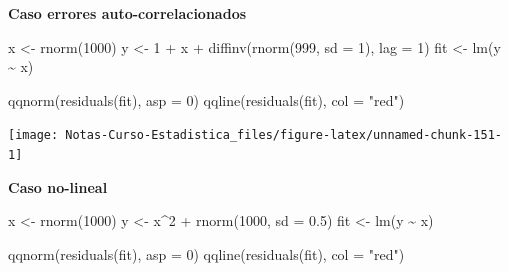 \documentclass[
  12pt,
]{book}
\newenvironment{Shaded}{\begin{snugshade}}{\end{snugshade}}
\newcommand{\AttributeTok}[1]{\textcolor[rgb]{0.77,0.63,0.00}{#1}}
\newcommand{\DecValTok}[1]{\textcolor[rgb]{0.00,0.00,0.81}{#1}}
\newcommand{\FloatTok}[1]{\textcolor[rgb]{0.00,0.00,0.81}{#1}}
\newcommand{\FunctionTok}[1]{\textcolor[rgb]{0.00,0.00,0.00}{#1}}
\newcommand{\NormalTok}[1]{#1}
\newcommand{\OtherTok}[1]{\textcolor[rgb]{0.56,0.35,0.01}{#1}}
\newcommand{\SpecialCharTok}[1]{\textcolor[rgb]{0.00,0.00,0.00}{#1}}
\newcommand{\StringTok}[1]{\textcolor[rgb]{0.31,0.60,0.02}{#1}}
\theoremstyle{definition}
\theoremstyle{definition}
\theoremstyle{definition}
\theoremstyle{definition}
\theoremstyle{remark}
\begin{document}
\textbf{Caso errores auto-correlacionados}

\begin{Shaded}
\begin{Highlighting}[]
\NormalTok{x }\OtherTok{\textless{}{-}} \FunctionTok{rnorm}\NormalTok{(}\DecValTok{1000}\NormalTok{)}
\NormalTok{y }\OtherTok{\textless{}{-}} \DecValTok{1} \SpecialCharTok{+}\NormalTok{ x }\SpecialCharTok{+} \FunctionTok{diffinv}\NormalTok{(}\FunctionTok{rnorm}\NormalTok{(}\DecValTok{999}\NormalTok{, }\AttributeTok{sd =} \DecValTok{1}\NormalTok{), }\AttributeTok{lag =} \DecValTok{1}\NormalTok{)}
\NormalTok{fit }\OtherTok{\textless{}{-}} \FunctionTok{lm}\NormalTok{(y }\SpecialCharTok{\textasciitilde{}}\NormalTok{ x)}
\end{Highlighting}
\end{Shaded}

\begin{Shaded}
\begin{Highlighting}[]
\FunctionTok{qqnorm}\NormalTok{(}\FunctionTok{residuals}\NormalTok{(fit), }\AttributeTok{asp =} \DecValTok{0}\NormalTok{)}
\FunctionTok{qqline}\NormalTok{(}\FunctionTok{residuals}\NormalTok{(fit), }\AttributeTok{col =} \StringTok{"red"}\NormalTok{)}
\end{Highlighting}
\end{Shaded}

\begin{center}\texttt{[image: Notas-Curso-Estadistica\_files/figure-latex/unnamed-chunk-151-1]} \end{center}

\textbf{Caso no-lineal}

\begin{Shaded}
\begin{Highlighting}[]
\NormalTok{x }\OtherTok{\textless{}{-}} \FunctionTok{rnorm}\NormalTok{(}\DecValTok{1000}\NormalTok{)}
\NormalTok{y }\OtherTok{\textless{}{-}}\NormalTok{ x}\SpecialCharTok{\^{}}\DecValTok{2} \SpecialCharTok{+} \FunctionTok{rnorm}\NormalTok{(}\DecValTok{1000}\NormalTok{, }\AttributeTok{sd =} \FloatTok{0.5}\NormalTok{)}
\NormalTok{fit }\OtherTok{\textless{}{-}} \FunctionTok{lm}\NormalTok{(y }\SpecialCharTok{\textasciitilde{}}\NormalTok{ x)}
\end{Highlighting}
\end{Shaded}

\begin{Shaded}
\begin{Highlighting}[]
\FunctionTok{qqnorm}\NormalTok{(}\FunctionTok{residuals}\NormalTok{(fit), }\AttributeTok{asp =} \DecValTok{0}\NormalTok{)}
\FunctionTok{qqline}\NormalTok{(}\FunctionTok{residuals}\NormalTok{(fit), }\AttributeTok{col =} \StringTok{"red"}\NormalTok{)}
\end{Highlighting}
\end{Shaded}
\end{document}
